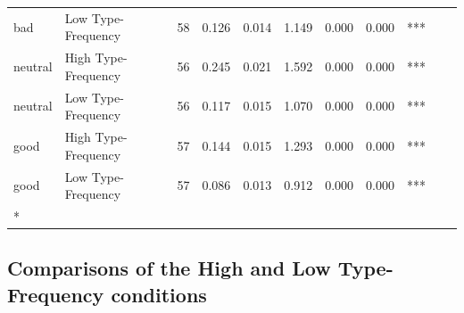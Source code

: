 \documentclass[
]{article}
\begin{document}
\begin{longtable}[t]{llrrrrrrlrr}
\hspace{1em}bad & Low Type-Frequency & 58 & 0.126 & 0.014 & 1.149 & 0.000 & 0.000 & *** &  & \\
\hspace{1em}neutral & High Type-Frequency & 56 & 0.245 & 0.021 & 1.592 & 0.000 & 0.000 & *** &  & \\
\hspace{1em}neutral & Low Type-Frequency & 56 & 0.117 & 0.015 & 1.070 & 0.000 & 0.000 & *** &  & \\
\hspace{1em}good & High Type-Frequency & 57 & 0.144 & 0.015 & 1.293 & 0.000 & 0.000 & *** &  & \\
\hspace{1em}good & Low Type-Frequency & 57 & 0.086 & 0.013 & 0.912 & 0.000 & 0.000 & *** &  & \\*
\end{longtable}

\clearpage

\subsection{Comparisons of the High and Low Type-Frequency conditions}\label{comparisons-of-the-high-and-low-type-frequency-conditions-4}
\end{document}
